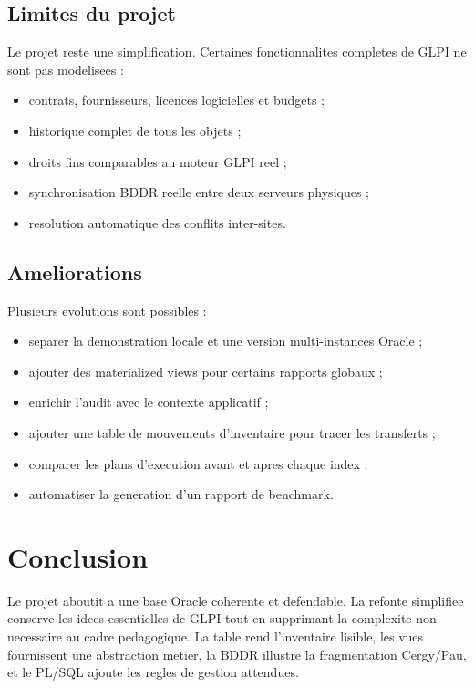 \documentclass[11pt,a4paper]{article}
\newcommand{\code}[1]{\texttt{\detokenize{#1}}}
\begin{document}
\subsection{Limites du projet}

Le projet reste une simplification. Certaines fonctionnalites completes de GLPI
ne sont pas modelisees :

\begin{itemize}
  \item contrats, fournisseurs, licences logicielles et budgets ;
  \item historique complet de tous les objets ;
  \item droits fins comparables au moteur GLPI reel ;
  \item synchronisation BDDR reelle entre deux serveurs physiques ;
  \item resolution automatique des conflits inter-sites.
\end{itemize}

\subsection{Ameliorations}

Plusieurs evolutions sont possibles :

\begin{itemize}
  \item separer la demonstration locale et une version multi-instances Oracle ;
  \item ajouter des materialized views pour certains rapports globaux ;
  \item enrichir l'audit avec le contexte applicatif ;
  \item ajouter une table de mouvements d'inventaire pour tracer les transferts ;
  \item comparer les plans d'execution avant et apres chaque index ;
  \item automatiser la generation d'un rapport de benchmark.
\end{itemize}

\section{Conclusion}

Le projet aboutit a une base Oracle coherente et defendable. La refonte
simplifiee conserve les idees essentielles de GLPI tout en supprimant la
complexite non necessaire au cadre pedagogique. La table \code{assets} rend
l'inventaire lisible, les vues fournissent une abstraction metier, la BDDR
illustre la fragmentation Cergy/Pau, et le PL/SQL ajoute les regles de gestion
attendues.
\end{document}
